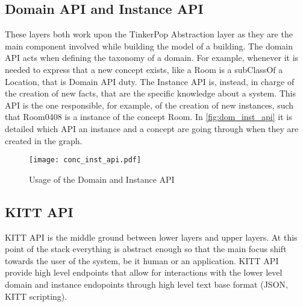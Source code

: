 \subsection{Domain API and Instance API}
These layers both work upon the TinkerPop Abstraction layer as they are the main component involved while building the model of a building. The domain API acts when defining the taxonomy of a domain. For example, whenever it is needed to express that a new concept exists, like a Room is a subClassOf a Location, that is Domain API duty. The Instance API is, instead, in charge of the creation of new facts, that are the specific knowledge about a system. This API is the one responsible, for example, of the creation of new instances, such that Room0408 is a instance of the concept Room. In \autoref{fig:dom_inst_api} it is detailed which API an instance and a concept are going through when they are created in the graph.
\begin{figure}
  \centering
  \texttt{[image: conc\_inst\_api.pdf]}
  \caption{Usage of the Domain and Instance API}
  \label{fig:dom_inst_api}
\end{figure}

\subsection{KITT API}\label{subsec:kitt_api}
KITT API is the middle ground between lower layers and upper layers. At this point of the stack everything is abstract enough so that the main focus shift towards the user of the system, be it human or an application. KITT API provide high level endpoints that allow for interactions with the lower level domain and instance endopoints through high level text base format (JSON, KITT scripting).

